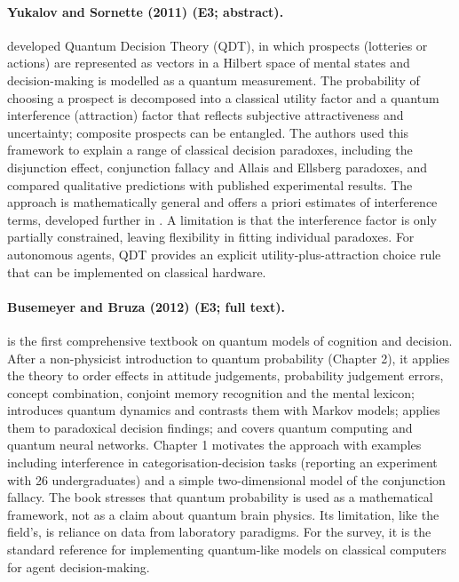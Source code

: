 \documentclass[10pt,a4paper]{article}
\begin{document}
\paragraph{Yukalov and Sornette (2011) (E3; abstract).} \citet{Yukalov2011} developed Quantum Decision Theory (QDT), in which prospects (lotteries or actions) are represented as vectors in a Hilbert space of mental states and decision-making is modelled as a quantum measurement. The probability of choosing a prospect is decomposed into a classical utility factor and a quantum interference (attraction) factor that reflects subjective attractiveness and uncertainty; composite prospects can be entangled. The authors used this framework to explain a range of classical decision paradoxes, including the disjunction effect, conjunction fallacy and Allais and Ellsberg paradoxes, and compared qualitative predictions with published experimental results. The approach is mathematically general and offers a priori estimates of interference terms, developed further in \citep{Yukalov2016}. A limitation is that the interference factor is only partially constrained, leaving flexibility in fitting individual paradoxes. For autonomous agents, QDT provides an explicit utility-plus-attraction choice rule that can be implemented on classical hardware.

\paragraph{Busemeyer and Bruza (2012) (E3; full text).} \citet{Busemeyer2012} is the first comprehensive textbook on quantum models of cognition and decision. After a non-physicist introduction to quantum probability (Chapter 2), it applies the theory to order effects in attitude judgements, probability judgement errors, concept combination, conjoint memory recognition and the mental lexicon; introduces quantum dynamics and contrasts them with Markov models; applies them to paradoxical decision findings; and covers quantum computing and quantum neural networks. Chapter 1 motivates the approach with examples including interference in categorisation-decision tasks (reporting an experiment with 26 undergraduates) and a simple two-dimensional model of the conjunction fallacy. The book stresses that quantum probability is used as a mathematical framework, not as a claim about quantum brain physics. Its limitation, like the field's, is reliance on data from laboratory paradigms. For the survey, it is the standard reference for implementing quantum-like models on classical computers for agent decision-making.
\end{document}
